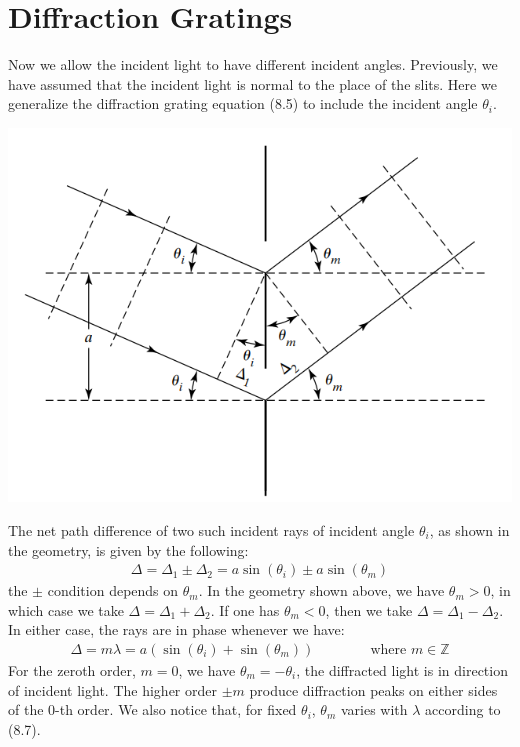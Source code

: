 \documentclass[11pt]{book}
\theoremstyle{break}
\theoremstyle{break}
\newcommand{\Z}{\mathbb{Z}}
\begin{document}
\section[Diffraction Gratings]{\color{red} Diffraction Gratings\color{black}}
Now we allow the incident light to have different incident angles. Previously, we have assumed that the incident light is normal to the place of the slits. Here we generalize the diffraction grating equation (8.5) to include the incident angle $\theta_i$.
\begin{center}
\includegraphics[scale=0.8]{DiffAngle}
\end{center}
 The net path difference of two such incident rays of incident angle $\theta_i$, as shown in the geometry, is given by the following:
\begin{align*}
\Delta = \Delta_1 \pm \Delta_2 = a\sin(\theta_i) \pm a\sin(\theta_m)
\end{align*}
the $\pm$ condition depends on $\theta_m$. In the geometry shown above, we have $\theta_m > 0$, in which case we take $\Delta = \Delta_1 + \Delta_2$. If one has $\theta_m<0$, then we take $\Delta = \Delta_1 - \Delta_2$. In either case, the rays are in phase whenever we have:
\begin{align}
\Delta = m\lambda = a\left( \sin(\theta_i) + \sin(\theta_m)\right) \qquad \qquad \text{where }m \in \Z
\end{align}
 For the zeroth order, $m=0$, we have $\theta_m = -\theta_i$, the diffracted light is in direction of incident light. The higher order $\pm m$ produce diffraction peaks on either sides of the $0$-th order. We also notice that, for fixed $\theta_i$, $\theta_m$ varies with $\lambda$ according to (8.7). \\
 
\end{document}
